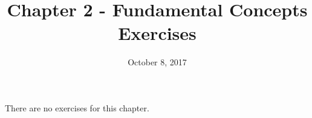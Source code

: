 \documentclass{article}
\title{Chapter 2 - Fundamental Concepts \\
Exercises}
\date{October 8, 2017}
\begin{document}
\maketitle
{}

There are no exercises for this chapter.
\end{document}

